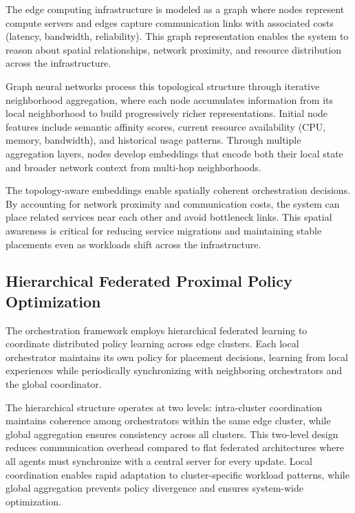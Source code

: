 \documentclass[conference]{IEEEtran}
\begin{document}
	The edge computing infrastructure is modeled as a graph where nodes represent compute servers and edges capture communication links with associated costs (latency, bandwidth, reliability). This graph representation enables the system to reason about spatial relationships, network proximity, and resource distribution across the infrastructure.
	
	Graph neural networks process this topological structure through iterative neighborhood aggregation, where each node accumulates information from its local neighborhood to build progressively richer representations. Initial node features include semantic affinity scores, current resource availability (CPU, memory, bandwidth), and historical usage patterns. Through multiple aggregation layers, nodes develop embeddings that encode both their local state and broader network context from multi-hop neighborhoods.
	
	The topology-aware embeddings enable spatially coherent orchestration decisions. By accounting for network proximity and communication costs, the system can place related services near each other and avoid bottleneck links. This spatial awareness is critical for reducing service migrations and maintaining stable placements even as workloads shift across the infrastructure.
	
	\subsection{Hierarchical Federated Proximal Policy Optimization}
	\label{subsec:hierarchical_ppo}
	
	The orchestration framework employs hierarchical federated learning to coordinate distributed policy learning across edge clusters. Each local orchestrator maintains its own policy for placement decisions, learning from local experiences while periodically synchronizing with neighboring orchestrators and the global coordinator.
	
	The hierarchical structure operates at two levels: intra-cluster coordination maintains coherence among orchestrators within the same edge cluster, while global aggregation ensures consistency across all clusters. This two-level design reduces communication overhead compared to flat federated architectures where all agents must synchronize with a central server for every update. Local coordination enables rapid adaptation to cluster-specific workload patterns, while global aggregation prevents policy divergence and ensures system-wide optimization.
	
\end{document}
